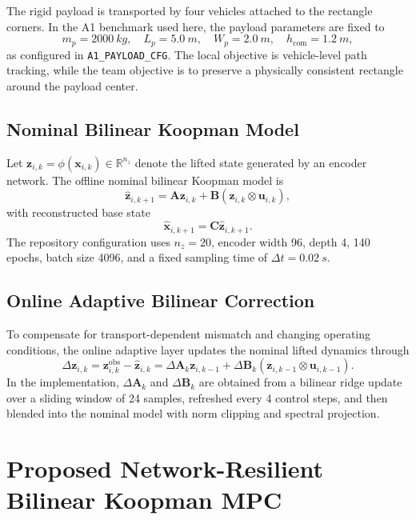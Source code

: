 \documentclass[twocolumn,3p,times,procedia]{elsarticle}
\begin{document}
The rigid payload is transported by four vehicles attached to the rectangle corners. In the A1 benchmark used here, the payload parameters are fixed to
\begin{equation}
m_p=\SI{2000}{kg},\quad L_p=\SI{5.0}{m},\quad W_p=\SI{2.0}{m},\quad h_{\text{com}}=\SI{1.2}{m},
\end{equation}
as configured in \texttt{A1\_PAYLOAD\_CFG}. The local objective is vehicle-level path tracking, while the team objective is to preserve a physically consistent rectangle around the payload center.

\subsection{Nominal Bilinear Koopman Model}
Let $\bm{z}_{i,k}=\phi(\bm{x}_{i,k})\in\mathbb{R}^{n_z}$ denote the lifted state generated by an encoder network. The offline nominal bilinear Koopman model is
\begin{equation}
\hat{\bm{z}}_{i,k+1}=\bm{A}\bm{z}_{i,k}+\bm{B}\left(\bm{z}_{i,k}\otimes \bm{u}_{i,k}\right),
\label{eq:nominal_bilinear}
\end{equation}
with reconstructed base state
\begin{equation}
\hat{\bm{x}}_{i,k+1}=\bm{C}\hat{\bm{z}}_{i,k+1}.
\end{equation}
The repository configuration uses $n_z=20$, encoder width 96, depth 4, 140 epochs, batch size 4096, and a fixed sampling time of $\Delta t=\SI{0.02}{s}$.

\subsection{Online Adaptive Bilinear Correction}
To compensate for transport-dependent mismatch and changing operating conditions, the online adaptive layer updates the nominal lifted dynamics through
\begin{equation}
\Delta\bm{z}_{i,k}=\bm{z}^{\text{obs}}_{i,k}-\hat{\bm{z}}_{i,k}
=\Delta \bm{A}_{k}\bm{z}_{i,k-1}+\Delta \bm{B}_{k}\left(\bm{z}_{i,k-1}\otimes \bm{u}_{i,k-1}\right).
\label{eq:delta_model}
\end{equation}
In the implementation, $\Delta \bm{A}_{k}$ and $\Delta \bm{B}_{k}$ are obtained from a bilinear ridge update over a sliding window of 24 samples, refreshed every 4 control steps, and then blended into the nominal model with norm clipping and spectral projection.

\section{Proposed Network-Resilient Bilinear Koopman MPC}
\end{document}
